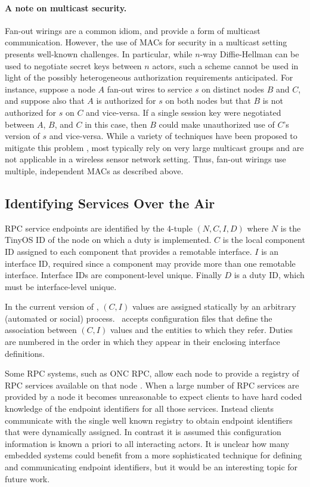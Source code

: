 \paragraph{A note on multicast security.} Fan-out wirings are a common idiom, and provide a form
of multicast communication. However, the use of MACs for security in a multicast setting
presents well-known challenges. In particular, while $n$-way Diffie-Hellman can be used to
negotiate secret keys between $n$ actors, such a scheme cannot be used in light of the possibly
heterogeneous authorization requirements anticipated. For instance, suppose a node $A$ fan-out
wires to service $s$ on distinct nodes $B$ and $C$, and suppose also that $A$ is authorized for
$s$ on both nodes but that $B$ is not authorized for $s$ on $C$ and vice-versa. If a single
session key were negotiated between $A$, $B$, and $C$ in this case, then $B$ could make
unauthorized use of $C$'s version of $s$ and vice-versa. While a variety of techniques have been
proposed to mitigate this problem \cite{canetti-1999}, most typically rely on very large
multicast groups and are not applicable in a wireless sensor network setting. Thus, fan-out
wirings use multiple, independent MACs as described above.

\subsection{Identifying Services Over the Air}

RPC service endpoints are identified by the 4-tuple $(N, C, I, D)$ where $N$ is the TinyOS ID of
the node on which a duty is implemented. $C$ is the local component ID assigned to each
component that provides a remotable interface. $I$ is an interface ID, required since a
component may provide more than one remotable interface. Interface IDs are component-level
unique. Finally $D$ is a duty ID, which must be interface-level unique.

In the current version of \Sprocket, $(C, I)$ values are assigned statically by an arbitrary
(automated or social) process. \Sprocket\ accepts configuration files that define the
association between $(C, I)$ values and the entities to which they refer. Duties are numbered in
the order in which they appear in their enclosing interface definitions.

Some RPC systems, such as ONC RPC, allow each node to provide a registry of RPC services
available on that node \cite{RFC-1833}. When a large number of RPC services are provided by a
node it becomes unreasonable to expect clients to have hard coded knowledge of the endpoint
identifiers for all those services. Instead clients communicate with the single well known
registry to obtain endpoint identifiers that were dynamically assigned. In contrast it is assumed
this configuration information is known a priori to all interacting actors. It is unclear how
many embedded systems could benefit from a more sophisticated technique for defining and
communicating endpoint identifiers, but it would be an interesting topic for future work.

